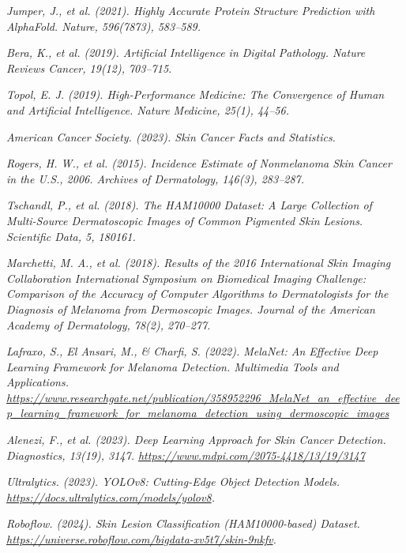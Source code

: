 \documentclass[a4paper,12pt]{report}
\begin{document}
\begin{spacing}{1.5}
\begin{thebibliography}{99}
 \emph{Jumper, J., et al. (2021). Highly Accurate Protein Structure Prediction with AlphaFold. Nature, 596(7873), 583–589.}

 \emph{Bera, K., et al. (2019). Artificial Intelligence in Digital Pathology. Nature Reviews Cancer, 19(12), 703–715.}

 \emph{Topol, E. J. (2019). High-Performance Medicine: The Convergence of Human and Artificial Intelligence. Nature Medicine, 25(1), 44–56.}

 \emph{American Cancer Society. (2023). Skin Cancer Facts and Statistics.}

 \emph{Rogers, H. W., et al. (2015). Incidence Estimate of Nonmelanoma Skin Cancer in the U.S., 2006. Archives of Dermatology, 146(3), 283–287.}

 \emph{Tschandl, P., et al. (2018). The HAM10000 Dataset: A Large Collection of Multi-Source Dermatoscopic Images of Common Pigmented Skin Lesions. Scientific Data, 5, 180161.}

 \emph{Marchetti, M. A., et al. (2018). Results of the 2016 International Skin Imaging Collaboration International Symposium on Biomedical Imaging Challenge: Comparison of the Accuracy of Computer Algorithms to Dermatologists for the Diagnosis of Melanoma from Dermoscopic Images. Journal of the American Academy of Dermatology, 78(2), 270–277.}

 \emph{Lafraxo, S., El Ansari, M., \& Charfi, S. (2022). MelaNet: An Effective Deep Learning Framework for Melanoma Detection. Multimedia Tools and Applications. \url{https://www.researchgate.net/publication/358952296_MelaNet_an_effective_deep_learning_framework_for_melanoma_detection_using_dermoscopic_images}}

 \emph{Alenezi, F., et al. (2023). Deep Learning Approach for Skin Cancer Detection. Diagnostics, 13(19), 3147. \url{https://www.mdpi.com/2075-4418/13/19/3147}}



 \emph{Ultralytics. (2023). YOLOv8: Cutting-Edge Object Detection Models. \url{https://docs.ultralytics.com/models/yolov8}.}



 \emph{Roboflow. (2024). Skin Lesion Classification (HAM10000-based) Dataset. \url{https://universe.roboflow.com/bigdata-xv5t7/skin-9nkfv}.}

\end{thebibliography}

\end{spacing}
\end{document}
